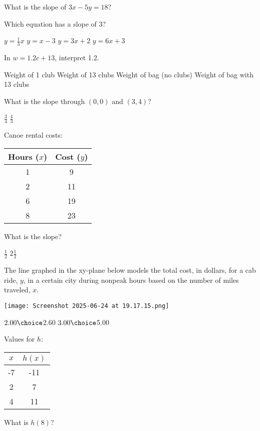 \documentclass[12pt]{exam}
\begin{document}
\begin{questions}
\question What is the slope of $3x - 5y = 18$?

\question Which equation has a slope of 3?
\begin{choices}
\choice $y = \frac{1}{3}x$
\choice $y = x - 3$
\choice $y = 3x + 2$
\choice $y = 6x + 3$
\end{choices}

\question In $w = 1.2c + 13$, interpret 1.2.
\begin{choices}
\choice Weight of 1 club
\choice Weight of 13 clubs
\choice Weight of bag (no clubs)
\choice Weight of bag with 13 clubs
\end{choices}

\question What is the slope through $(0,0)$ and $(3,4)$?
\begin{choices}
\choice $\frac{3}{4}$
\choice $\frac{4}{3}$
\end{choices}

\question Canoe rental costs:
\begin{center}
\begin{tabular}{|c|c|}
\hline
Hours ($x$) & Cost ($y$) \\
\hline
1 & 9 \\
2 & 11 \\
6 & 19 \\
8 & 23 \\
\hline
\end{tabular}
\end{center}
What is the slope?
\begin{choices}
\choice $\frac{1}{2}$
\choice $2\frac{1}{2}$
\end{choices}

\question The line graphed in the xy-plane below models the total cost, in dollars, for a cab ride, $y$, in a certain city during nonpeak hours based on the number of miles traveled, $x$.
\begin{center}
\texttt{[image: Screenshot 2025-06-24 at 19.17.15.png]}
\end{center}
\begin{choices}
\choice $2.00
\choice $2.60
\choice $3.00
\choice $5.00
\end{choices}

\question Values for $h$:
\begin{center}
\begin{tabular}{|c|c|}
\hline
$x$ & $h(x)$ \\
\hline
-7 & -11 \\
2 & 7 \\
4 & 11 \\
\hline
\end{tabular}
\end{center}
What is $h(8)$?
\begin{choices}
\end{choices}


\end{questions}
\end{document}
